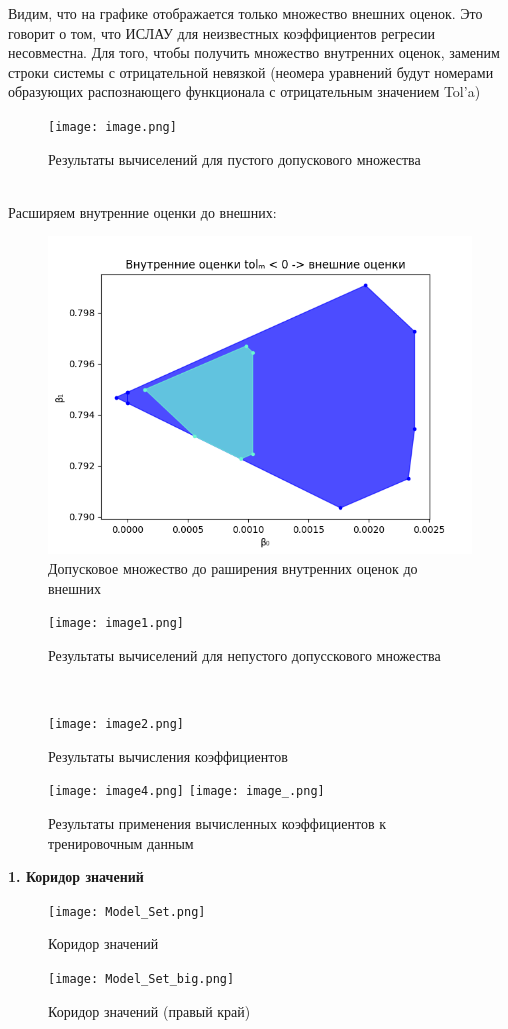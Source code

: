 \documentclass[10pt]{article}
\begin{document}
\hspace{-0.5cm}Видим, что на графике отображается только множество внешних оценок. Это говорит о том, что ИСЛАУ для неизвестных коэффициентов регресии несовместна. Для того, чтобы получить множество внутренних оценок, заменим строки системы с отрицательной невязкой (неомера уравнений будут номерами образующих распознающего функционала с отрицательным значением Tol'a)

\begin{figure}[h!]
    \centering
    \texttt{[image: image.png]}
    \caption{Результаты вычиселений для пустого допускового множества}
\end{figure}\\
\newpage
\hspace{-0.5cm}Расширяем внутренние оценки до внешних:
\begin{figure}[h!]
    \centering
    \includegraphics[width=0.65\linewidth]{tol-after-alg.png}
    \caption{Допусковое множество до раширения внутренних оценок до внешних}
\end{figure}
\begin{figure}[h!]
    \centering
    \texttt{[image: image1.png]}
    \caption{Результаты вычиселений для непустого допусскового множества}
\end{figure}\\
\newpage
\begin{figure}[h!]
    \centering
    \texttt{[image: image2.png]}
    \caption{Результаты вычисления коэффициентов}
\end{figure}
\begin{figure}[h!]
    \centering
    \texttt{[image: image4.png]}
    \texttt{[image: image\_.png]}
    \caption{Результаты применения вычисленных коэффициентов к тренировочным данным}
\end{figure}
\newpage
\hspace{-0.5cm}\textbf{1. Коридор значений}\\
\begin{figure}[h!]
    \centering
    \texttt{[image: Model\_Set.png]}
    \caption{Коридор значений}
\end{figure}
\begin{figure}[h!]
    \centering
    \texttt{[image: Model\_Set\_big.png]}
    \caption{Коридор значений (правый край)}
\end{figure}
\end{document}
